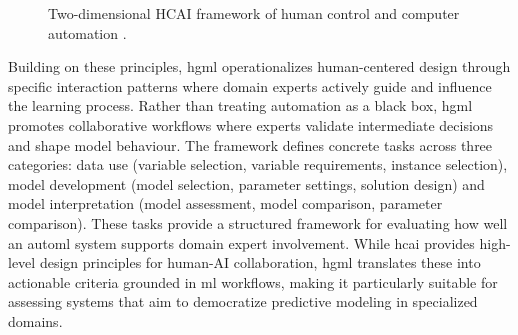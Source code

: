 \documentclass[conference,twocolumn]{IEEEtran}
\begin{document}
\begin{figure}[ht]
\centering
{}
\caption{Two-dimensional HCAI framework of human control and computer automation \cite{shneiderman2022human}.}
\label{fig:HCAI_dimensions}
\end{figure}
  
Building on these principles, \gls{hgml} \cite{gil2019towards} operationalizes   
human-centered design through specific interaction patterns where domain experts   
actively guide and influence the learning process. Rather than treating automation   
as a black box, \gls{hgml} promotes collaborative workflows where experts validate   
intermediate decisions and shape model behaviour. The framework defines concrete   
tasks across three categories: data use (variable selection, variable requirements,   
instance selection), model development (model selection, parameter settings, solution design) and model interpretation (model assessment, model comparison, parameter comparison). These tasks provide a structured framework for evaluating how well an \gls{automl} system supports domain expert involvement. While \gls{hcai} provides high-level design principles for human-AI collaboration, \gls{hgml} translates these into actionable criteria grounded in \gls{ml} workflows, making it particularly suitable for assessing systems that aim to democratize predictive modeling in specialized domains.
\end{document}
